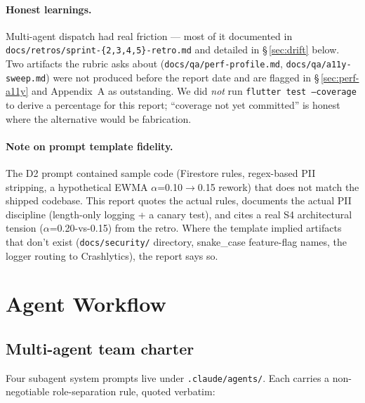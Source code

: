 \documentclass[11pt,a4paper]{article}
\begin{document}
\paragraph{Honest learnings.} Multi-agent dispatch had real friction ---
most of it documented in \texttt{docs/retros/sprint-\{2,3,4,5\}-retro.md}
and detailed in \S\,\ref{sec:drift} below. Two artifacts the rubric asks
about (\texttt{docs/qa/perf-profile.md},
\texttt{docs/qa/a11y-sweep.md}) were not produced before the report date
and are flagged in \S\,\ref{sec:perf-a11y} and Appendix~A as outstanding.
We did \emph{not} run \texttt{flutter test --coverage} to derive a
percentage for this report; ``coverage not yet committed'' is honest
where the alternative would be fabrication.

\paragraph{Note on prompt template fidelity.} The D2 prompt contained
sample code (Firestore rules, regex-based PII stripping, a hypothetical
EWMA $\alpha$=0.10$\to$0.15 rework) that does not match the shipped
codebase. This report quotes the actual rules, documents the actual
PII discipline (length-only logging + a canary test), and cites a real
S4 architectural tension ($\alpha$=0.20-vs-0.15) from the retro. Where
the template implied artifacts that don't exist
(\texttt{docs/security/} directory, snake\_case feature-flag names, the
logger routing to Crashlytics), the report says so.

\newpage
\tableofcontents
\newpage

\section{Agent Workflow}

\subsection{Multi-agent team charter}

Four subagent system prompts live under \texttt{.claude/agents/}. Each
carries a non-negotiable role-separation rule, quoted verbatim:
\end{document}
